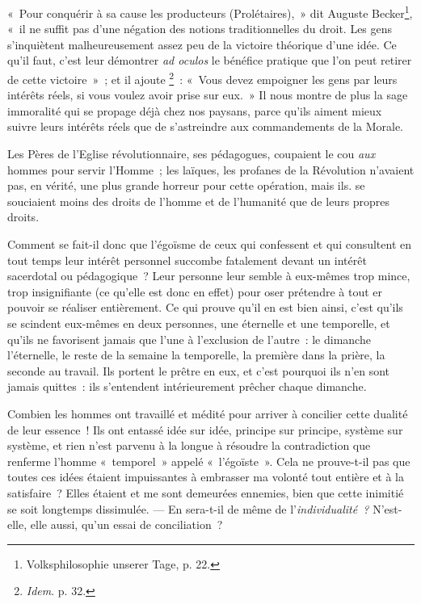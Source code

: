 \documentclass[french,twoside]{book} %
\begin{document}
« Pour conquérir à sa cause les producteurs (Prolétaires), » dit Auguste Becker\footnote{ \noindent Volksphilosophie unserer Tage, p. 22.
 }, « il ne suffit pas d’une négation des notions traditionnelles du droit. Les gens s’inquiètent malheureusement assez peu de la victoire théorique d’une idée. Ce qu’il faut, c’est leur démontrer \emph{ad oculos} le bénéfice pratique que l’on peut retirer de cette victoire » ; et il ajoute \footnote{ \noindent \emph{Idem}. p. 32.
 } :  « Vous devez empoigner les gens par leurs intérêts réels, si vous voulez avoir prise sur eux. » Il nous montre de plus la sage immoralité qui se propage déjà chez nos paysans, parce qu’ils aiment mieux suivre leurs intérêts réels que de s’astreindre aux commandements de la Morale.\par
Les Pères de l’Eglise révolutionnaire, ses pédagogues, coupaient le cou \emph{aux} hommes pour servir l’Homme ; les laïques, les profanes de la Révolution n’avaient pas, en vérité, une plus grande horreur pour cette opération, mais ils. se souciaient moins des droits de l’homme et de l’humanité que de leurs propres droits.\par
Comment se fait-il donc que l’égoïsme de ceux qui confessent et qui consultent en tout temps leur intérêt personnel succombe fatalement devant un intérêt sacerdotal ou pédagogique ? Leur personne leur semble à eux-mêmes trop mince, trop insignifiante (ce qu’elle est donc en effet) pour oser prétendre à tout er pouvoir se réaliser entièrement. Ce qui prouve qu’il en est bien ainsi, c’est qu’ils se scindent eux-mêmes en deux personnes, une éternelle et une temporelle, et qu’ils ne favorisent jamais que l’une à l’exclusion de l’autre : le dimanche l’éternelle, le reste de la semaine la temporelle, la première dans la prière, la seconde au travail. Ils portent le prêtre en eux, et c’est pourquoi ils n’en sont jamais quittes : ils s’entendent intérieurement prêcher chaque dimanche.\par
Combien les hommes ont travaillé et médité pour arriver à concilier cette dualité de leur essence ! Ils ont entassé idée sur idée, principe sur principe, système sur système, et rien n’est parvenu à la longue à résoudre la contradiction que renferme l’homme « temporel » appelé « l’égoïste ». Cela ne prouve-t-il pas que toutes ces idées étaient impuissantes à embrasser ma volonté tout entière et à la satisfaire ? Elles étaient et me sont demeurées ennemies, bien que cette inimitié se soit longtemps dissimulée. — En  sera-t-il de même de l’\emph{individualité ?} N’est-elle, elle aussi, qu’un essai de conciliation ?\par
\end{document}
